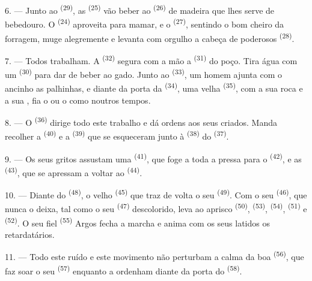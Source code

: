 6. --- Junto ao  \textsuperscript{(29)}, as 
\textsuperscript{(25)} vão beber ao  \textsuperscript{(26)} de madeira que
lhes serve de bebedouro. O  \textsuperscript{(24)} aproveita para
mamar, e o  \textsuperscript{(27)}, sentindo o bom cheiro da forragem,
muge alegremente e levanta com orgulho a cabeça de poderosos
 \textsuperscript{(28)}.

7. --- Todos trabalham. A  \textsuperscript{(32)} segura com a mão a
 \textsuperscript{(31)} do poço. Tira água com um 
\textsuperscript{(30)} para dar de beber ao gado. Junto ao 
\textsuperscript{(33)}, um homem ajunta com o ancinho as palhinhas, e diante da
porta da  \textsuperscript{(34)}, uma velha 
\textsuperscript{(35)}, com a sua roca e a sua , fia o 
ou o  como noutros tempos.

\VUsaut{3.0mm}
\VUsaut{3.0mm}

8. --- O  \textsuperscript{(36)} dirige todo este trabalho e dá
ordens aos seus criados. Manda recolher a  \textsuperscript{(40)} e a
 \textsuperscript{(39)} que se esqueceram junto à 
\textsuperscript{(38)} do  \textsuperscript{(37)}.

9. --- Os seus gritos assustam uma  \textsuperscript{(41)}, que foge a
toda a pressa para o  \textsuperscript{(42)}, e as 
\textsuperscript{(43)}, que se apressam a voltar ao 
\textsuperscript{(44)}.

10. --- Diante do  \textsuperscript{(48)}, o velho 
\textsuperscript{(45)} que traz de volta o seu  \textsuperscript{(49)}.
Com o seu  \textsuperscript{(46)}, que nunca o deixa, tal como o seu
 \textsuperscript{(47)} descolorido, leva ao aprisco
 \textsuperscript{(50)},  \textsuperscript{(53)},
 \textsuperscript{(54)},  \textsuperscript{(51)} e
 \textsuperscript{(52)}. O seu fiel 
\textsuperscript{(55)} Argos fecha a marcha e anima com os seus latidos os
retardatários.

11. --- Todo este ruído e este movimento não perturbam a calma da boa
 \textsuperscript{(56)}, que faz soar o seu 
\textsuperscript{(57)} enquanto a ordenham diante da porta do 
\textsuperscript{(58)}.

